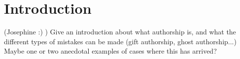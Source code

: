 \section{Introduction}
(Josephine :) ) Give an introduction about what authorship is, and what the different types of mistakes can be made (gift authorship, ghost authorship...)
Maybe one or two anecdotal examples of cases where this has arrived?